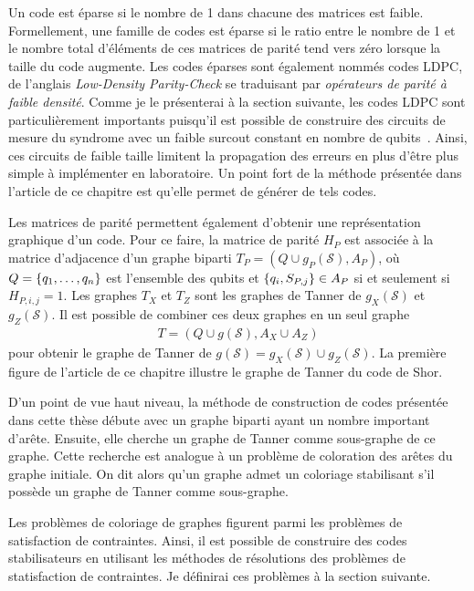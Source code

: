 Un code est éparse si le nombre de 1 dans chacune des matrices est faible.
Formellement,
une famille de codes est éparse si le ratio entre le nombre de 1 
et le nombre total d'éléments de ces matrices de parité tend vers zéro 
lorsque la taille du code augmente.
Les codes éparses sont également nommés codes LDPC,
de l'anglais \textit{Low-Density Parity-Check} se traduisant par
\textit{opérateurs de parité à faible densité}.
Comme je le présenterai à la section suivante,
les codes LDPC sont particulièrement importants puisqu'il est possible de construire
des circuits de mesure du syndrome avec un faible surcout
constant en nombre de qubits~\cite{gottesman_fault-tolerant_2013}.
Ainsi,
ces circuits de faible taille limitent la propagation des erreurs en plus d'être plus simple à 
implémenter en laboratoire.
Un point fort de la méthode présentée dans l'article de ce chapitre est qu'elle permet 
de générer de tels codes.

Les matrices de parité permettent également d'obtenir une représentation graphique d'un code.
Pour ce faire, la matrice de parité $H_P$ est associée à la matrice d'adjacence d'un
graphe biparti $T_P = (Q \cup g_P(\mathcal S), A_P)$,
où $Q = \qty{q_1, \dots, q_n}$ est l'ensemble des qubits
et $\qty{q_i, S_{P, j}} \in A_P$ si et seulement si $H_{P, i, j} = 1$.
Les graphes $T_X$ et $T_Z$ sont les graphes de Tanner de $g_X(\mathcal S)$ et $g_Z(\mathcal S)$.
Il est possible de combiner ces deux graphes en un seul graphe
\begin{align}
  T = (Q \cup g(\mathcal S), A_X \cup A_Z)
\end{align}
pour obtenir le graphe de Tanner de $g(\mathcal S) = g_X(\mathcal S) \cup g_Z(\mathcal S)$.
La première figure de l'article de ce chapitre illustre le graphe de Tanner du code de Shor.

D'un point de vue haut niveau,
la méthode de construction de codes présentée dans cette thèse
débute avec un graphe biparti ayant un nombre important d'arête.
Ensuite, elle cherche un graphe de Tanner comme sous-graphe de ce graphe.
Cette recherche est analogue à un problème de coloration des arêtes du graphe initiale.
On dit alors qu'un graphe admet un coloriage stabilisant s'il possède un graphe de Tanner comme sous-graphe.

Les problèmes de coloriage de graphes figurent parmi les problèmes de satisfaction de contraintes.
Ainsi,
il est possible de construire des codes stabilisateurs en utilisant les méthodes 
de résolutions des problèmes de statisfaction de contraintes.
Je définirai ces problèmes à la section suivante.


